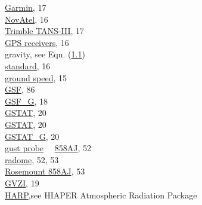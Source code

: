 \documentclass[
  english,
]{book}
\begin{document}
\hspace*{0.333em}\hspace*{0.333em}\href{./3-the-state-of-the-aircraft.html\#gglat}{Garmin},
17\\
\hspace*{0.333em}\hspace*{0.333em}\href{./3-the-state-of-the-aircraft.html\#gglat}{NovAtel},
16\\
\hspace*{0.333em}\hspace*{0.333em}\href{./3-the-state-of-the-aircraft.html\#gglat}{Trimble
TANS-III}, 17\\
\href{./3-the-state-of-the-aircraft.html\#global-positioning-systems}{GPS
receivers}, 16\\
gravity, see Eqn. (\href{./1-introduction.html\#eq:gsublambda}{1.1})\\
\hspace*{0.333em}\hspace*{0.333em}\href{./3-the-state-of-the-aircraft.html\#palt}{standard},
16\\
\href{./3-the-state-of-the-aircraft.html\#ggspd}{ground speed}, 15\\
\href{./3-the-state-of-the-aircraft.html\#gsf}{GSF}, 86\\
\href{./3-the-state-of-the-aircraft.html\#ggspd}{GSF\_G}, 18\\
\href{./3-the-state-of-the-aircraft.html\#ggstatus\%7C}{GSTAT}, 20\\
\href{./3-the-state-of-the-aircraft.html\#ggstatus}{GSTAT}, 20\\
\href{./3-the-state-of-the-aircraft.html\#ggstatus\%7C}{GSTAT\_G}, 20\\
\href{./4-the-state-of-the-atmosphere.html\#variable-names}{gust probe}
~~\href{./4-the-state-of-the-atmosphere.html\#relative-wind}{858AJ},
52\\
\hspace*{0.333em}\hspace*{0.333em}\href{./4-the-state-of-the-atmosphere.html\#relative-wind}{radome},
52, 53\\
\hspace*{0.333em}\hspace*{0.333em}\href{./4-the-state-of-the-atmosphere.html\#relative-wind}{Rosemount
858AJ}, 53\\
\href{./3-the-state-of-the-aircraft.html\#ggvspd}{GVZI}, 19\\
\href{./8-radiation-variables.html\#harp}{HARP},see HIAPER Atmospheric
Radiation Package\\
\end{document}
